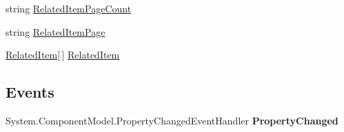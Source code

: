 \begin{DoxyCompactItemize}
\begin{DoxyCompactList}\small\item\em \end{DoxyCompactList}\item 
\hypertarget{class_amazon___price___finder_1_1amazon_1_1ecs_1_1_related_items_a32042b5b7db6b31edb6de9cd3f37b5f1}{string \hyperlink{class_amazon___price___finder_1_1amazon_1_1ecs_1_1_related_items_a32042b5b7db6b31edb6de9cd3f37b5f1}{Related\-Item\-Page\-Count}}\label{class_amazon___price___finder_1_1amazon_1_1ecs_1_1_related_items_a32042b5b7db6b31edb6de9cd3f37b5f1}

\begin{DoxyCompactList}\small\item\em \end{DoxyCompactList}\item 
\hypertarget{class_amazon___price___finder_1_1amazon_1_1ecs_1_1_related_items_aee01c9518856159328edcf3ecf8afe2e}{string \hyperlink{class_amazon___price___finder_1_1amazon_1_1ecs_1_1_related_items_aee01c9518856159328edcf3ecf8afe2e}{Related\-Item\-Page}}\label{class_amazon___price___finder_1_1amazon_1_1ecs_1_1_related_items_aee01c9518856159328edcf3ecf8afe2e}

\begin{DoxyCompactList}\small\item\em \end{DoxyCompactList}\item 
\hypertarget{class_amazon___price___finder_1_1amazon_1_1ecs_1_1_related_items_a96a74f60a54b1dd352af43e8fd39bc69}{\hyperlink{class_amazon___price___finder_1_1amazon_1_1ecs_1_1_related_item}{Related\-Item}\mbox{[}$\,$\mbox{]} \hyperlink{class_amazon___price___finder_1_1amazon_1_1ecs_1_1_related_items_a96a74f60a54b1dd352af43e8fd39bc69}{Related\-Item}}\label{class_amazon___price___finder_1_1amazon_1_1ecs_1_1_related_items_a96a74f60a54b1dd352af43e8fd39bc69}

\begin{DoxyCompactList}\small\item\em \end{DoxyCompactList}\end{DoxyCompactItemize}
\subsection*{Events}
\begin{DoxyCompactItemize}
\item 
\hypertarget{class_amazon___price___finder_1_1amazon_1_1ecs_1_1_related_items_a55c787bf874157f8699ec618fd64733d}{System.\-Component\-Model.\-Property\-Changed\-Event\-Handler {\bfseries Property\-Changed}}\label{class_amazon___price___finder_1_1amazon_1_1ecs_1_1_related_items_a55c787bf874157f8699ec618fd64733d}

\end{DoxyCompactItemize}


